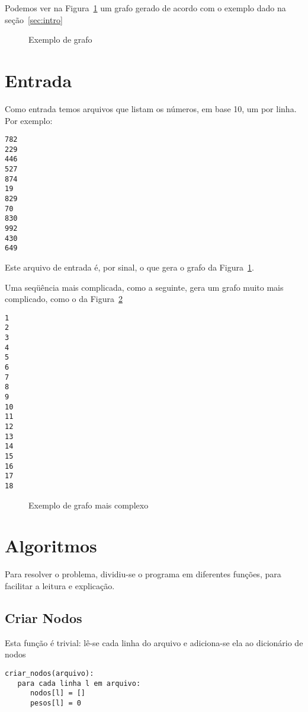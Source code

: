 \documentclass[12pt]{article}
\begin{document}

Podemos ver na Figura~\ref{fig:testeprof} um grafo gerado de acordo com o exemplo dado na se\c{c}ão~\ref{sec:intro}

\begin{figure}[h!]
    \begin{dot2tex}[neato,options=-tmath]
        
    \end{dot2tex}
    \caption{Exemplo de grafo}
    \label{fig:testeprof}
\end{figure}


\section{Entrada}\label{sec:entrada}
Como entrada temos arquivos que listam os números, em base 10, um por linha. Por exemplo:
\begin{lstlisting}
782
229
446
527
874
19
829
70
830
992
430
649
\end{lstlisting}

Este arquivo de entrada é, por sinal, o que gera o grafo da Figura~\ref{fig:testeprof}.

Uma seqüência mais complicada, como a seguinte, gera um grafo muito mais complicado, como o da Figura~\ref{fig:testebobo}
\begin{lstlisting}
1
2
3
4
5
6
7
8
9
10
11
12
13
14
15
16
17
18
\end{lstlisting}

\begin{figure}[h!]
  \begin{dot2tex}[neato,options=-tmath]
    
  \end{dot2tex}
  \caption{Exemplo de grafo mais complexo}
  \label{fig:testebobo}
\end{figure}

\section{Algoritmos}\label{sec:algoritmos}
Para resolver o problema, dividiu-se o programa em diferentes fun\c{c}ões, para facilitar a leitura e explica\c{c}ão.

\subsection{Criar Nodos}\label{sec:algoritmos:criar-nodos}
Esta fun\c{c}ão é trivial: lê-se cada linha do arquivo e adiciona-se ela ao dicionário de nodos
\begin{lstlisting}
criar_nodos(arquivo):
   para cada linha l em arquivo:
      nodos[l] = []
      pesos[l] = 0
\end{lstlisting}
\end{document}
